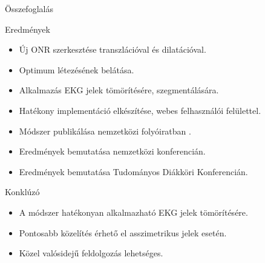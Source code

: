 \documentclass{beamer}
\begin{document}
\begin{frame}{Összefoglalás}
\linespread{0.8}
\small
\vspace{-2mm}
\begin{block}{Eredmények}
	\begin{itemize}
		\item Új ONR szerkesztése transzlációval és dilatációval.
		\item Optimum létezésének belátása.
		\item Alkalmazás EKG jelek tömörítésére, szegmentálására.
		\item Hatékony implementáció elkészítése, webes felhasználói felülettel.
		\item Módszer publikálása nemzetközi folyóiratban \cite{sajat}.
		\item Eredmények bemutatása nemzetközi konferencián.
		\item Eredmények bemutatása Tudományos Diákköri Konferencián.
	\end{itemize}
	\end{block}				
	\begin{block}{Konklúzó}
	\begin{itemize}
		\item A módszer hatékonyan alkalmazható EKG jelek tömörítésére.
		\item Pontosabb közelítés érhető el asszimetrikus jelek esetén.
		\item Közel valósidejű feldolgozás lehetséges.	
	\end{itemize}
	\end{block}	
\end{frame}
\end{document}
